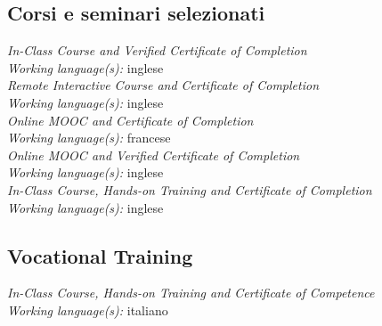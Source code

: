 \documentclass[
  a4paper, 
]{fortysecondscv}
\begin{document}
\subsection{Corsi e seminari selezionati}
\begin{cvtable}
		{{\small\emph{\small In-Class Course and Verified Certificate of Completion}\\\textit{\small Working language(s):} inglese}\\[-0.8em]}
		{{\small\emph{\small Remote Interactive Course and Certificate of Completion}\\\textit{\small Working language(s):} inglese}\\[-0.8em]}
		{{\small\emph{\small Online MOOC and Certificate of Completion}\\\textit{\small Working language(s):} francese}\\[-0.8em]}
		{{\small\emph{\small Online MOOC and Verified Certificate of Completion}\\\textit{\small Working language(s):} inglese}\\[-0.8em]}
		{{\small\emph{\small In-Class Course, Hands-on Training and Certificate of Completion}\\\textit{\small Working language(s):} inglese}}
\end{cvtable}
\subsection{Vocational Training}
\begin{cvtable}
		{{\small\emph{\small In-Class Course, Hands-on Training and Certificate of Competence}\\\textit{\small Working language(s):} italiano}}
\end{cvtable}
\end{document}
